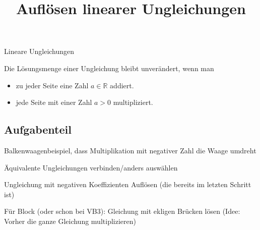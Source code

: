 \documentclass{uebungsblatt}
\title{Auflösen linearer Ungleichungen}
\begin{document}
\maketitle
\begin{contents}
    Lineare Ungleichungen
\end{contents}


\begin{theorem}
    Die Lösungsmenge einer Ungleichung bleibt unverändert, wenn man
    \begin{itemize}
        \item zu jeder Seite eine Zahl $a\in\mathbb{R}$ addiert.
        \item jede Seite mit einer Zahl $a>0$ multipliziert.
    \end{itemize}
\end{theorem}

\subsection*{Aufgabenteil}

Balkenwaagenbeispiel, dass Multiplikation mit negativer Zahl die Waage umdreht

Äquivalente Ungleichungen verbinden/anders auswählen

Ungleichung mit negativen Koeffizienten Auflösen (die bereits im letzten Schritt ist)

Für Block (oder schon bei VB3): Gleichung mit ekligen Brücken lösen (Idee: Vorher die ganze Gleichung multiplizieren)

\end{document}
